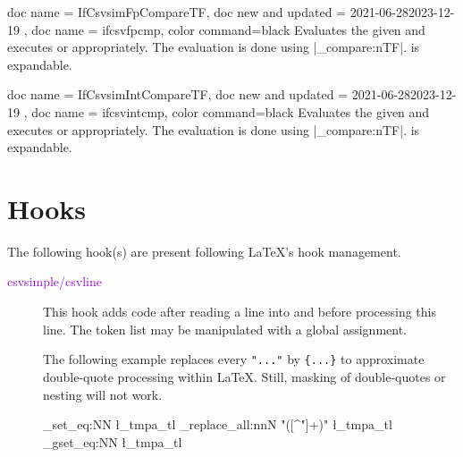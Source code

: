 \documentclass[a4paper,11pt]{ltxdoc}
\begin{document}
\begin{docCommands}[
      doc parameter = \marg{floating point expression}\marg{token list B}\marg{true}\marg{false}
    ]
  {
    { doc name = IfCsvsimFpCompareTF, doc new and updated = {2021-06-28}{2023-12-19} },
    { doc name = ifcsvfpcmp, color command=black }
  }
  Evaluates the given 
  and executes  or  appropriately.
  The evaluation is done using |\fp_compare:nTF|.
   is expandable.
\end{docCommands}


\begin{docCommands}[
      doc parameter = \marg{integer expression}\marg{token list B}\marg{true}\marg{false}
    ]
  {
    { doc name = IfCsvsimIntCompareTF, doc new and updated = {2021-06-28}{2023-12-19} },
    { doc name = ifcsvintcmp, color command=black }
  }
  Evaluates the given 
  and executes  or  appropriately.
  The evaluation is done using |\int_compare:nTF|.
   is expandable.
\end{docCommands}



\clearpage
\section{Hooks}\label{sec:hooks}%
The following hook(s) are present following \LaTeX's hook management.

\begin{description}
\item[\textcolor{DarkViolet}{\ttfamily csvsimple/csvline}]
  This hook adds code after reading
  a line into  and before processing this line.
  The token list  may be manipulated with a global assignment.\par
  The following example replaces every \verb+"..."+ by \verb+{...}+ to
  approximate double-quote processing within \LaTeX. Still, masking of double-quotes
  or nesting will not work.
\begin{dispListing}
  {
    \tl_set_eq:NN \l_tmpa_tl \csvline
    \regex_replace_all:nnN { "([^"]+)" } { {\1} } \l_tmpa_tl
    \tl_gset_eq:NN \csvline \l_tmpa_tl
  }
\end{dispListing}

\end{description}
\end{document}
